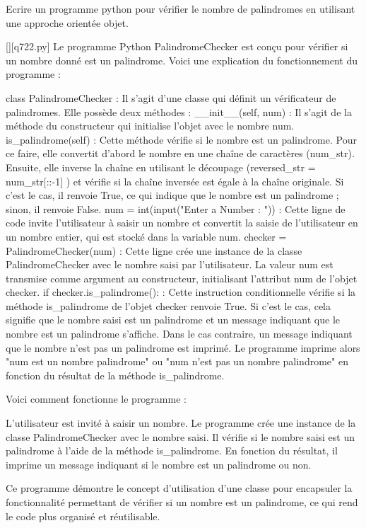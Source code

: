        \question
        Ecrire un programme python pour vérifier le nombre de palindromes en utilisant une approche orientée objet.
        \par
        \begin{solution}
            \renewcommand{\nomfichier}{q722.py}
            \pythonfile{\chemincode \nomfichier}[][\nomfichier]
            Le programme Python PalindromeChecker est conçu pour vérifier si un nombre donné est un palindrome. Voici une explication du fonctionnement du programme :

    class PalindromeChecker : Il s'agit d'une classe qui définit un vérificateur de palindromes. Elle possède deux méthodes :
        \_\_init\_\_(self, num) : Il s'agit de la méthode du constructeur qui initialise l'objet avec le nombre num.
        is\_palindrome(self) : Cette méthode vérifie si le nombre est un palindrome. Pour ce faire, elle convertit d'abord le nombre en une chaîne de caractères (num\_str). Ensuite, elle inverse la chaîne en utilisant le découpage (reversed\_str = num\_str[::-1] ) et vérifie si la chaîne inversée est égale à la chaîne originale. Si c'est le cas, il renvoie True, ce qui indique que le nombre est un palindrome ; sinon, il renvoie False.
    num = int(input("Enter a Number : ")) : Cette ligne de code invite l'utilisateur à saisir un nombre et convertit la saisie de l'utilisateur en un nombre entier, qui est stocké dans la variable num.
    checker = PalindromeChecker(num) : Cette ligne crée une instance de la classe PalindromeChecker avec le nombre saisi par l'utilisateur. La valeur num est transmise comme argument au constructeur, initialisant l'attribut num de l'objet checker.
    if checker.is\_palindrome(): : Cette instruction conditionnelle vérifie si la méthode is\_palindrome de l'objet checker renvoie True. Si c'est le cas, cela signifie que le nombre saisi est un palindrome et un message indiquant que le nombre est un palindrome s'affiche. Dans le cas contraire, un message indiquant que le nombre n'est pas un palindrome est imprimé.
    Le programme imprime alors "{num} est un nombre palindrome" ou "{num} n'est pas un nombre palindrome" en fonction du résultat de la méthode is\_palindrome.

Voici comment fonctionne le programme :

    L'utilisateur est invité à saisir un nombre.
    Le programme crée une instance de la classe PalindromeChecker avec le nombre saisi.
    Il vérifie si le nombre saisi est un palindrome à l'aide de la méthode is\_palindrome.
    En fonction du résultat, il imprime un message indiquant si le nombre est un palindrome ou non.

Ce programme démontre le concept d'utilisation d'une classe pour encapsuler la fonctionnalité permettant de vérifier si un nombre est un palindrome, ce qui rend le code plus organisé et réutilisable.
        \end{solution}
        

